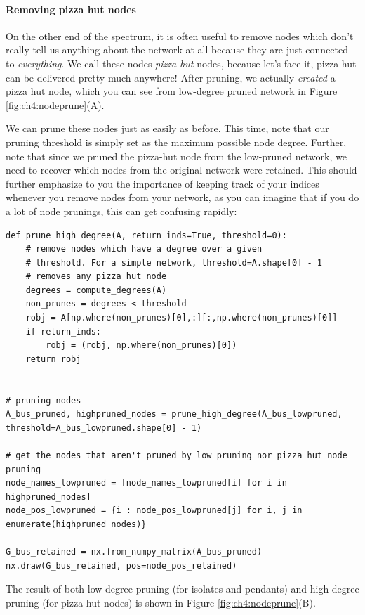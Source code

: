 \paragraph{Removing pizza hut nodes}

On the other end of the spectrum, it is often useful to remove nodes which don't really tell us anything about the network at all because they are just connected to \emph{everything}. We call these nodes \emph{pizza hut} nodes, because let's face it, pizza hut can be delivered pretty much anywhere! After pruning, we actually \emph{created} a pizza hut node, which you can see from low-degree pruned network in Figure \ref{fig:ch4:nodeprune}(A). 

We can prune these nodes just as easily as before. This time, note that our pruning threshold is simply set as the maximum possible node degree. Further, note that since we pruned the pizza-hut node from the low-pruned network, we need to recover which nodes from the original network were retained. This should further emphasize to you the importance of keeping track of your indices whenever you remove nodes from your network, as you can imagine that if you do a lot of node prunings, this can get confusing rapidly:

\begin{lstlisting}[style=python]
def prune_high_degree(A, return_inds=True, threshold=0):
    # remove nodes which have a degree over a given
    # threshold. For a simple network, threshold=A.shape[0] - 1
    # removes any pizza hut node
    degrees = compute_degrees(A)
    non_prunes = degrees < threshold
    robj = A[np.where(non_prunes)[0],:][:,np.where(non_prunes)[0]]
    if return_inds:
        robj = (robj, np.where(non_prunes)[0])
    return robj


# pruning nodes 
A_bus_pruned, highpruned_nodes = prune_high_degree(A_bus_lowpruned, threshold=A_bus_lowpruned.shape[0] - 1)

# get the nodes that aren't pruned by low pruning nor pizza hut node pruning
node_names_lowpruned = [node_names_lowpruned[i] for i in highpruned_nodes]
node_pos_lowpruned = {i : node_pos_lowpruned[j] for i, j in enumerate(highpruned_nodes)}

G_bus_retained = nx.from_numpy_matrix(A_bus_pruned)
nx.draw(G_bus_retained, pos=node_pos_retained)
\end{lstlisting}
The result of both low-degree pruning (for isolates and pendants) and high-degree pruning (for pizza hut nodes) is shown in Figure \ref{fig:ch4:nodeprune}(B). 

